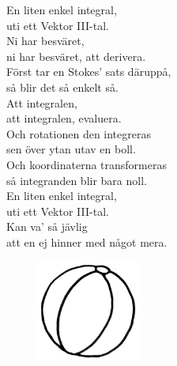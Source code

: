 \documentclass[a6paper, 10pt, twoside]{article}
\begin{document}
\noindent
\begin{center}
\end{center}
\begin{lyrics}
En liten enkel integral, \\
uti ett Vektor III-tal. \\
Ni har besväret, \\
ni har besväret, att derivera. 
\vspace{5pt} \\
Först tar en Stokes' sats däruppå, \\
så blir det så enkelt så. \\
Att integralen, \\
att integralen, evaluera. 
\vspace{5pt} \\
Och rotationen den integreras \\
sen över ytan utav en boll. \\
Och koordinaterna transformeras \\
så integranden blir bara noll. 
\vspace{5pt} \\
En liten enkel integral, \\
uti ett Vektor III-tal. \\
Kan va' så jävlig \\
att en ej hinner med något mera. 
\end{lyrics}
\begin{figure}[!h]
\hspace{120pt}\includegraphics[width=0.3\textwidth]{boll.jpg}
\end{figure}
\end{document}
